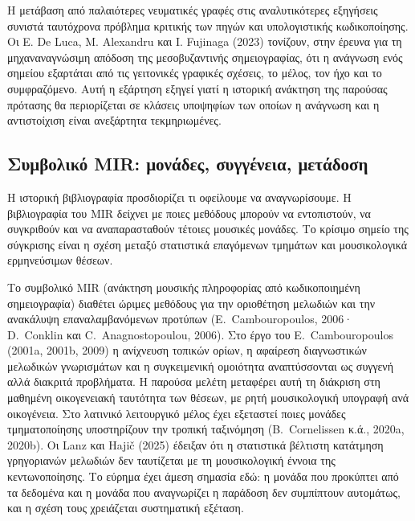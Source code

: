 \documentclass[11pt,a4paper]{article}
\begin{document}
Η μετάβαση από παλαιότερες νευματικές γραφές στις αναλυτικότερες εξηγήσεις συνιστά ταυτόχρονα πρόβλημα κριτικής των πηγών και υπολογιστικής κωδικοποίησης. Οι E. De Luca, M. Alexandru και I. Fujinaga (2023) τονίζουν, στην έρευνα για τη μηχαναναγνώσιμη απόδοση της μεσοβυζαντινής σημειογραφίας, ότι η ανάγνωση ενός σημείου εξαρτάται από τις γειτονικές γραφικές σχέσεις, το μέλος, τον ήχο και το συμφραζόμενο. Αυτή η εξάρτηση εξηγεί γιατί η ιστορική ανάκτηση της παρούσας πρότασης θα περιορίζεται σε κλάσεις υποψηφίων των οποίων η ανάγνωση και η αντιστοίχιση είναι ανεξάρτητα τεκμηριωμένες.

\subsection{Συμβολικό MIR: μονάδες, συγγένεια, μετάδοση}
Η ιστορική βιβλιογραφία προσδιορίζει τι οφείλουμε να αναγνωρίσουμε. Η βιβλιογραφία του MIR δείχνει με ποιες μεθόδους μπορούν να εντοπιστούν, να συγκριθούν και να αναπαρασταθούν τέτοιες μουσικές μονάδες. Το κρίσιμο σημείο της σύγκρισης είναι η σχέση μεταξύ στατιστικά επαγόμενων τμημάτων και μουσικολογικά ερμηνεύσιμων θέσεων.

Το συμβολικό MIR (ανάκτηση μουσικής πληροφορίας από κωδικοποιημένη σημειογραφία) διαθέτει ώριμες μεθόδους για την οριοθέτηση μελωδιών και την ανακάλυψη επαναλαμβανόμενων προτύπων (E.~Cambouropoulos, 2006· D.~Conklin και C.~Anagnostopoulou, 2006). Στο έργο του E.~Cambouropoulos (2001a, 2001b, 2009) η ανίχνευση τοπικών ορίων, η αφαίρεση διαγνωστικών μελωδικών γνωρισμάτων και η συγκειμενική ομοιότητα αναπτύσσονται ως συγγενή αλλά διακριτά προβλήματα. Η παρούσα μελέτη μεταφέρει αυτή τη διάκριση στη μαθημένη οικογενειακή ταυτότητα των θέσεων, με ρητή μουσικολογική υπογραφή ανά οικογένεια. Στο λατινικό λειτουργικό μέλος έχει εξεταστεί ποιες μονάδες τμηματοποίησης υποστηρίζουν την τροπική ταξινόμηση (B.~Cornelissen κ.ά., 2020a, 2020b). Οι Lanz και Hajič (2025) έδειξαν ότι η στατιστικά βέλτιστη κατάτμηση γρηγοριανών μελωδιών δεν ταυτίζεται με τη μουσικολογική έννοια της κεντωνοποίησης. Το εύρημα έχει άμεση σημασία εδώ: η μονάδα που προκύπτει από τα δεδομένα και η μονάδα που αναγνωρίζει η παράδοση δεν συμπίπτουν αυτομάτως, και η σχέση τους χρειάζεται συστηματική εξέταση.
\end{document}
